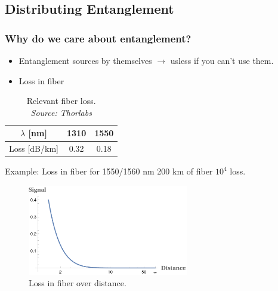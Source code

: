 \documentclass[serif,8pt]{beamer}
\begin{document}
\subsection{Distributing Entanglement}
\begin{frame}[t]
	\frametitle{Why do we care about entanglement?}
	\begin{itemize}
		\item Entanglement sources by themselves $\rightarrow$ usless if you can't use them.
		\item Loss in fiber
	\end{itemize}
	\begin{table}
		\caption{Relevant fiber loss.\\\textit{Source: Thorlabs}}\label{tab:fiberloss}
		\begin{tabular}{|c|c|c|}
			\hline
			$\lambda$ [nm] & 1310 & 1550\\
			\hline
			Loss [dB/km] & 0.32 &  0.18\\
			\hline
		\end{tabular}
	\end{table}
	\begin{exampleblock}{Example: Loss in fiber for 1550/1560 nm}
		200 km of fiber \rightarrow $10^4$ loss.
	\end{exampleblock}
	\begin{figure}
		\begin{center}
			\includegraphics[width=7cm]{FiberLoss.png}
		\end{center}
		\caption{Loss in fiber over distance.}\label{fig:fiberloss}
	\end{figure}
	
\end{frame}
\end{document}
